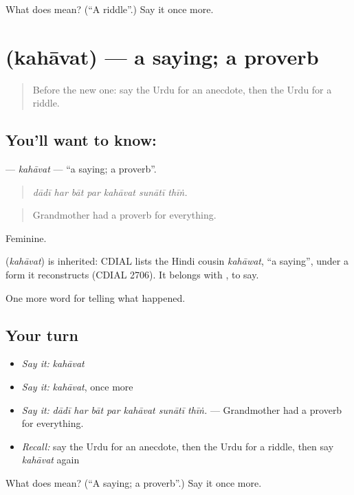 \begin{tcolorbox}[breakable,colback=teal!4,colframe=teal!35!black,title={Before you move on}]
What does  mean? (\textquotedblleft{}A riddle\textquotedblright{}.) Say it once more.
\end{tcolorbox}
\section[\texorpdfstring{\ur{کہاوت} (kahāvat)}{کہاوت (kahāvat)}]{ (kahāvat) — a saying; a proverb}

\label{lesson:UR-C324-kahavat}



\begin{quote}
Before the new one: say the Urdu for an anecdote, then the Urdu for a riddle.
\end{quote}

\subsection*{You'll want to know: }
\textbf{} — \emph{kahāvat} — \textquotedblleft{}a saying; a proverb\textquotedblright{}.

\begin{quote}
      
\end{quote}

\begin{quote}
\emph{dādī har bāt par kahāvat sunātī thīṅ.}
\end{quote}

\begin{quote}
Grandmother had a proverb for everything.
\end{quote}

Feminine.

\begin{cousinweb}
\textbf{} (\emph{kahāvat}) is inherited: CDIAL lists the Hindi cousin \emph{kahāwat}, \textquotedblleft{}a saying\textquotedblright{}, under a form it reconstructs (CDIAL 2706). It belongs with \textbf{}, to say.
\end{cousinweb}

\begin{grammarlens}[title={What you've built}]
One more word for telling what happened.
\end{grammarlens}

\subsection*{Your turn}
\begin{itemize}
\raggedright
  \item \emph{Say it:} \emph{kahāvat}
  \item \emph{Say it:} \emph{kahāvat}, once more
  \item \emph{Say it:} \emph{dādī har bāt par kahāvat sunātī thīṅ.} — Grandmother had a proverb for everything.
  \item \emph{Recall:} say the Urdu for an anecdote, then the Urdu for a riddle, then say \emph{kahāvat} again
\end{itemize}

\begin{tcolorbox}[breakable,colback=teal!4,colframe=teal!35!black,title={Before you move on}]
What does  mean? (\textquotedblleft{}A saying; a proverb\textquotedblright{}.) Say it once more.
\end{tcolorbox}
